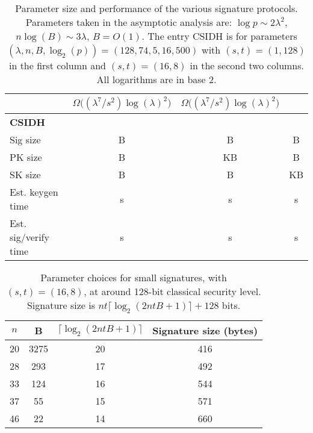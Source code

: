 \documentclass{llncs}
\begin{document}
\begin{landscape}
\begin{table}
\begin{tabular}{l | c | c | c |}
      & $\Omega\bigl((\lambda^7/s^2)\log(\lambda)^2\bigr)$
      & $\Omega\bigl((\lambda^7/s^2)\log(\lambda)^2\bigr)$\\
      \hline
      \hspace{1em}\textbf{CSIDH} &&&\\
      Sig size
      & \RejSig{} B & \ParSig{} B & \ComSig{} B\\
      PK size
      & \RejPK{} B & \ParPK{} KB & \ComPK{} B\\
      SK size
      & \RejSK{} B & \ParSK{} B & \ComSK{} KB \\
      Est. keygen time
      & \RejKG{} s & \ParKG{} s & \ComKG{} s\\
      Est. sig/verify time
      & \RejTime{} s & \ParTime{} s & \ComTime{} s
    \end{tabular}
    \caption{Parameter size and performance of the various signature
      protocols.
      Parameters taken in the asymptotic analysis are:
      $\log p \sim 2\lambda^2$, $n\log(B)\sim 3\lambda$, $B = O(1)$.
The entry CSIDH is for parameters $(\lambda,n,B,\log_2(p)) = (128, 74, 5, 16, 500)$ with $(s,t) = (1,128)$ in the first column and $(s,t)=(16,8)$ in the second two columns.
      All logarithms are in base 2.
    }
    \label{tab:comparison}
  \end{table}
\end{landscape}


\begin{table}
\begin{center}
\begin{tabular}{|c|c|c|c|} \hline
  $n$ & B & $\lceil \log_2( 2ntB + 1) \rceil$ & Signature size (bytes) \\
\hline
  20 & 3275 & 20 & 416 \\
  28 & 293 & 17 & 492 \\
  33 & 124 & 16 & 544 \\
  37 & 55 & 15 & 571 \\
  46 & 22 & 14 & 660 \\
\hline
\end{tabular}
\end{center}
\caption{Parameter choices for small signatures, with $(s,t)=(16,8)$, at around 128-bit classical security level. Signature size is $nt \lceil \log_2( 2ntB + 1) \rceil + 128$ bits. \label{tab:alt-params}}
\end{table}
\end{document}
